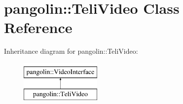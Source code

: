 \hypertarget{classpangolin_1_1_teli_video}{}\section{pangolin\+:\+:Teli\+Video Class Reference}
\label{classpangolin_1_1_teli_video}
Inheritance diagram for pangolin\+:\+:Teli\+Video\+:\begin{figure}[H]
\begin{center}
\leavevmode
\includegraphics[height=2.000000cm]{classpangolin_1_1_teli_video}
\end{center}
\end{figure}
